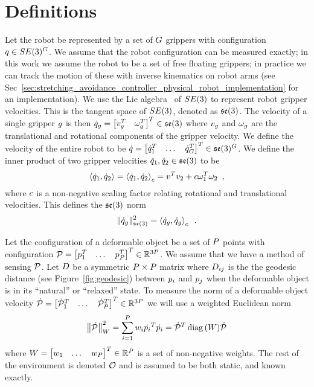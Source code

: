 
\section{Definitions}

Let the robot be represented by a set of $G$ grippers with configuration $q \in SE(3)^G$.  We assume that the robot configuration can be measured exactly; in this work we assume the robot to be a set of free floating grippers; in practice we can track the motion of these with inverse kinematics on robot arms (see Sec~\ref{sec:stretching_avoidance_controller_physical_robot_implementation} for an implementation). We use the Lie algebra~\cite{Murray1994} of $SE(3)$ to represent robot gripper velocities. This is the tangent space of $SE(3)$, denoted as $\mathfrak{se}(3)$. The velocity of a single gripper $g$ is then $\dot{q}_g = \begin{bmatrix}v_g^T & \omega_g^T\end{bmatrix}^T \in \mathfrak{se}(3)$ where $v_g$ and $\omega_g$ are the translational and rotational components of the gripper velocity. We define the velocity of the entire robot to be $\dot{q} = \begin{bmatrix}\dot{q}_1^T & \dots & \dot{q}_G^T \end{bmatrix}^T \in \mathfrak{se}(3)^G$. We define the inner product of two gripper velocities $\dot{q}_1, \dot{q}_2 \in \mathfrak{se}(3)$ to be 
\begin{equation}
    \left \langle \dot{q}_1, \dot{q}_2 \right \rangle = \left \langle \dot{q}_1, \dot{q}_2 \right \rangle_c = v^T v_2 + c \omega_1^T \omega_2 \enspace,
\end{equation}
where $c$ is a non-negative scaling factor relating rotational and translational velocities. This defines the $\mathfrak{se}(3)$ norm
\begin{equation}
    \| \dot{q}_g \|_{\mathfrak{se}(3)}^2 = \left \langle \dot{q}_g, \dot{q}_g \right \rangle_c \enspace .
\end{equation}

Let the configuration of a deformable object be a set of $P$ points with configuration $\mathcal{P} = \begin{bmatrix} p_1^T & \dots & p_P^T \end{bmatrix}^T \in \mathbb{R}^{3P}$. We assume that we have a method of sensing $\mathcal{P}$. Let $D$ be a symmetric $P \times P$ matrix where $D_{i j}$ is the the geodesic distance (see Figure~\ref{fig:geodesic}) between $p_i$ and $p_j$ when the deformable object is in its ``natural'' or ``relaxed'' state. To measure the norm of a deformable object velocity $\dot{\mathcal{P}} = \begin{bmatrix} \dot{\mathcal{P}}_1^T & \dots & \dot{\mathcal{P}}_P^T \end{bmatrix}^T \in \mathbb{R}^{3P}$ we will use a weighted Euclidean norm
\begin{equation}
    \left\| \dot{\mathcal{P}} \right\|^2_W = \sum_{i = 1}^P w_i \dot{p_i}^T \dot{p_i} = \dot{\mathcal{P}}^T \operatorname*{diag}{(W)} \dot{\mathcal{P}}
\end{equation}
where $W = \begin{bmatrix}w_1 & \dots & w_P \end{bmatrix}^T \in \mathbb{R}^P$ is a set of non-negative weights. The rest of the environment is denoted $\mathcal{O}$ and is assumed to be both static, and known exactly.

